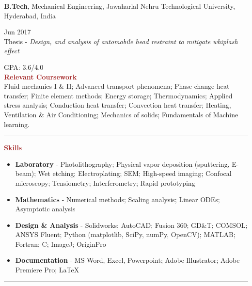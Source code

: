 \documentclass[11pt, letterpaper]{article}
\begin{document}
\vspace{6pt}
\textbf{B.Tech}, Mechanical Engineering, Jawaharlal Nehru Technological University, Hyderabad, India \hfill \raggedright{Jun 2017}\\
Thesis - \textit{Design, and analysis of automobile head restraint to mitigate whiplash effect} \hfill \raggedright{GPA: 3.6/4.0}
\\[6pt]
\noindent \textbf{\large \textcolor{Brown}{Relevant Coursework}}\vspace{2pt} \\
Fluid mechanics I \& II; Advanced transport phenomena; Phase-change heat transfer; Finite element methods; Energy storage; Thermodynamics; Applied stress analysis; Conduction heat transfer; Convection heat transfer; Heating, Ventilation \& Air Conditioning; Mechanics of solids; Fundamentals of Machine learning.
\vspace{-2pt} \\
\noindent \rule[2pt]{\textwidth}{0.5pt}
\newpage
\noindent \textbf{\large \textcolor{Brown}{Skills}}\vspace{-8pt}
\begin{multicols}{2}
\begin{itemize}[leftmargin=*]
\setlength\itemsep{-2pt}
\item \textbf{Laboratory} - Photolithography; Physical vapor deposition (sputtering, E-beam); Wet etching; Electroplating; SEM; High-speed imaging; Confocal microscopy; Tensiometry; Interferometry; Rapid prototyping
\item \textbf{Mathematics} - Numerical methods; Scaling analysis; Linear ODEs; Asymptotic analysis
\item \textbf{Design \& Analysis} - Solidworks; AutoCAD; Fusion 360; GD\&T; COMSOL; ANSYS Fluent; Python (matplotlib, SciPy, numPy, OpenCV); MATLAB; Fortran; C; ImageJ; OriginPro
\item\textbf{Documentation} - MS Word, Excel, Powerpoint; Adobe Illustrator; Adobe Premiere Pro; \LaTeX
\end{itemize}
\end{multicols}
\vspace{-10pt}
\noindent \rule[2pt]{\textwidth}{0.5pt}
\end{document}
